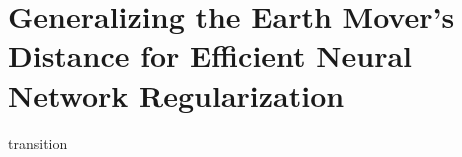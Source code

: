 \chapter{Generalizing the Earth Mover's Distance for Efficient Neural Network Regularization} \label{chap:demd}

transition







